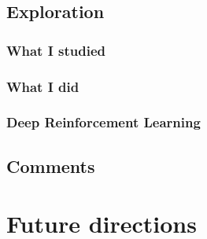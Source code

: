 \subsection{Exploration}
\subsubsection{What I studied}


\subsubsection{What I did}

\subsubsection{Deep Reinforcement Learning}

\subsection{Comments}

\section{Future directions}
